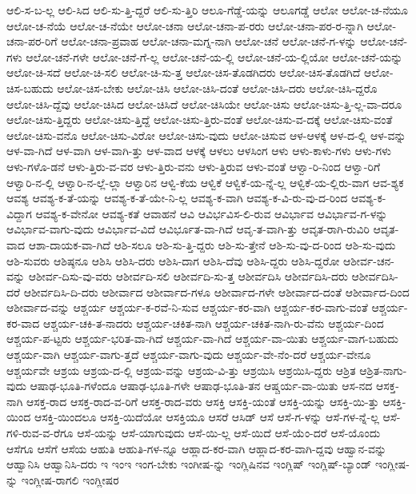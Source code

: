{ಆಲಿ-ಸ-ಬ-ಲ್ಲ
ಆಲಿ-ಸಿದ
ಆಲಿ-ಸು-ತ್ತಿ-ದ್ದರೆ
ಆಲಿ-ಸು-ತ್ತಿರಿ
ಆಲೂ-ಗೆಡ್ಡೆ-ಯನ್ನು
ಆಲೂಗಡ್ಡೆ
ಆಲೋ
ಆಲೋ-ಚ-ನೆಯೂ
ಆಲೋ-ಚ-ನೆಯೆ
ಆಲೋ-ಚ-ನೆಯೇ
ಆಲೋ-ಚನಾ
ಆಲೋ-ಚನಾ-ಪ-ರರು
ಆಲೋ-ಚನಾ-ಪರ-ರ-ನ್ನಾಗಿ
ಆಲೋ-ಚನಾ-ಪರ-ರಿಗೆ
ಆಲೋ-ಚನಾ-ಪ್ರವಾಹ
ಆಲೋ-ಚನಾ-ಮಗ್ನ-ನಾಗಿ
ಆಲೋ-ಚನೆ
ಆಲೋ-ಚನೆ-ಗ-ಳನ್ನು
ಆಲೋ-ಚನೆ-ಗಳು
ಆಲೋ-ಚನೆ-ಗಳೇ
ಆಲೋ-ಚನೆ-ಗೆ-ಲ್ಲ
ಆಲೋ-ಚನೆ-ಯ-ಲ್ಲಿ
ಆಲೋ-ಚನೆ-ಯ-ಲ್ಲಿಯೋ
ಆಲೋ-ಚನೆ-ಯನ್ನು
ಆಲೋ-ಚಿ-ಸದೆ
ಆಲೋ-ಚಿ-ಸಲಿ
ಆಲೋ-ಚಿ-ಸು-ತ್ತ
ಆಲೋ-ಚಿಸ-ತೊಡಗಿದರು
ಆಲೋ-ಚಿಸ-ತೊಡಗಿದೆ
ಆಲೋ-ಚಿಸ-ಬಹುದು
ಆಲೋ-ಚಿಸ-ಬೇಕು
ಆಲೋ-ಚಿಸಿ
ಆಲೋ-ಚಿಸಿ-ದಂತೆ
ಆಲೋ-ಚಿಸಿ-ದರು
ಆಲೋ-ಚಿಸಿ-ದ್ದರೊ
ಆಲೋ-ಚಿಸಿ-ದ್ದೆವು
ಆಲೋ-ಚಿಸಿದ
ಆಲೋ-ಚಿಸಿದೆ
ಆಲೋ-ಚಿಸಿಯೇ
ಆಲೋ-ಚಿಸು
ಆಲೋ-ಚಿಸು-ತ್ತಿ-ಲ್ಲ-ವಾ-ದರೂ
ಆಲೋ-ಚಿಸು-ತ್ತಿದ್ದರು
ಆಲೋ-ಚಿಸು-ತ್ತಿದ್ದೆ
ಆಲೋ-ಚಿಸು-ತ್ತಿರು-ವಂತೆ
ಆಲೋ-ಚಿಸು-ವ-ದಕ್ಕೆ
ಆಲೋ-ಚಿಸು-ವಂತೆ
ಆಲೋ-ಚಿಸು-ವನೊ
ಆಲೋ-ಚಿಸು-ವಿರೋ
ಆಲೋ-ಚಿಸು-ವುದು
ಆಲೋ-ಚಿಸುವ
ಆಳ-ಆಳಕ್ಕೆ
ಆಳ-ದ-ಲ್ಲಿ
ಆಳ-ವನ್ನು
ಆಳ-ವಾ-ಗಿದೆ
ಆಳ-ವಾಗಿ
ಆಳ-ವಾಗಿ-ತ್ತು
ಆಳ-ವಾದ
ಆಳಕ್ಕೆ
ಆಳಲು
ಆಳಸಿಂಗ
ಆಳು
ಆಳು-ಕಾಳು-ಗಳು
ಆಳು-ಗಳು
ಆಳು-ಗಳೊ-ಡನೆ
ಆಳು-ತ್ತಿರು-ವ-ವರ
ಆಳು-ತ್ತಿರು-ವನು
ಆಳು-ತ್ತಿರುವ
ಆಳು-ವಂತೆ
ಆಳ್ವಾ-ರಿ-ನಿಂದ
ಆಳ್ವಾ-ರಿಗೆ
ಆಳ್ವಾರಿ-ನ-ಲ್ಲಿ
ಆಳ್ವಾರಿ-ನ-ಲ್ಲೆ-ಲ್ಲಾ
ಆಳ್ವಾರಿನ
ಆಳ್ವಿ-ಕೆಯ
ಆಳ್ವಿಕೆ
ಆಳ್ವಿಕೆ-ಯ-ನ್ನೆ-ಲ್ಲ
ಆಳ್ವಿಕೆ-ಯ-ಲ್ಲಿರು-ವಾಗ
ಆವ-ಶ್ಯಕ
ಆವಶ್ಯ
ಆವಶ್ಯ-ಕ-ತೆ-ಯನ್ನು
ಆವಶ್ಯ-ಕ-ತೆ-ಯೇ-ನಿ-ಲ್ಲ
ಆವಶ್ಯ-ಕ-ವಾಗಿ
ಆವಶ್ಯ-ಕ-ವಿ-ರು-ವು-ದ-ರಿಂದ
ಆವಶ್ಯ-ಕ-ವಿದ್ದಾಗ
ಆವಶ್ಯ-ಕ-ವೇನೋ
ಆವಶ್ಯ-ಕತೆ
ಆವಾಹನೆ
ಆವಿ
ಆವಿರ್ಭವಿಸ-ಲಿ-ರುವ
ಆವಿರ್ಭಾವ
ಆವಿರ್ಭಾವ-ಗ-ಳನ್ನು
ಆವಿರ್ಭಾವ-ವಾಗು-ವುದು
ಆವಿರ್ಭಾವ-ವಿದೆ
ಆವಿರ್ಭೂತ-ವಾ-ಗಿದೆ
ಆವೃ-ತ-ವಾಗಿ-ತ್ತು
ಆವೃತ-ರಾಗಿ-ರುವಿರಿ
ಆವೃತ-ವಾದ
ಆಶಾ-ದಾಯಕ-ವಾ-ಗಿದೆ
ಆಶಿ-ಸಲೂ
ಆಶಿ-ಸು-ತ್ತಿ-ದ್ದರು
ಆಶಿ-ಸು-ತ್ತೇನೆ
ಆಶಿ-ಸು-ವು-ದ-ರಿಂದ
ಆಶಿ-ಸು-ವುದು
ಆಶಿ-ಸುವರು
ಆಶಿಷ್ಠನೂ
ಆಶಿಸಿ
ಆಶಿಸಿ-ದರು
ಆಶಿಸಿ-ದಾಗ
ಆಶಿಸಿ-ದೆವು
ಆಶಿಸಿ-ದ್ದರು
ಆಶಿಸಿ-ದ್ದರೋ
ಆಶೀರ್ವ-ಚನ-ವನ್ನು
ಆಶೀರ್ವ-ದಿಸು-ವು-ವರು
ಆಶೀರ್ವದಿ-ಸಲಿ
ಆಶೀರ್ವದಿ-ಸು-ತ್ತ
ಆಶೀರ್ವದಿಸಿ
ಆಶೀರ್ವದಿಸಿ-ದರು
ಆಶೀರ್ವದಿಸಿ-ದರೆ
ಆಶೀರ್ವದಿಸಿ-ದಿ-ದರು
ಆಶೀರ್ವಾದ
ಆಶೀರ್ವಾದ-ಗಳೂ
ಆಶೀರ್ವಾದ-ಗಳೇ
ಆಶೀರ್ವಾದ-ದಂತೆ
ಆಶೀರ್ವಾದ-ದಿಂದ
ಆಶೀರ್ವಾದ-ವನ್ನು
ಆಶ್ಚರ್ಯ
ಆಶ್ಚರ್ಯ-ಕ-ರವೆ-ನಿ-ಸುವ
ಆಶ್ಚರ್ಯ-ಕರ-ವಾಗಿ
ಆಶ್ಚರ್ಯ-ಕರ-ವಾಗು-ವಂತೆ
ಆಶ್ಚರ್ಯ-ಕರ-ವಾದ
ಆಶ್ಚರ್ಯ-ಚಕಿ-ತ-ನಾದರು
ಆಶ್ಚರ್ಯ-ಚಕಿತ-ನಾಗಿ
ಆಶ್ಚರ್ಯ-ಚಕಿತ-ನಾಗಿ-ರು-ವೆನು
ಆಶ್ಚರ್ಯ-ದಿಂದ
ಆಶ್ಚರ್ಯ-ಪ-ಟ್ಟರು
ಆಶ್ಚರ್ಯ-ಭರಿತ-ವಾ-ಗಿದೆ
ಆಶ್ಚರ್ಯ-ವಾ-ಗಿದೆ
ಆಶ್ಚರ್ಯ-ವಾ-ಯಿತು
ಆಶ್ಚರ್ಯ-ವಾಗ-ಬಹುದು
ಆಶ್ಚರ್ಯ-ವಾಗಿ
ಆಶ್ಚರ್ಯ-ವಾಗು-ತ್ತದೆ
ಆಶ್ಚರ್ಯ-ವಾಗು-ವುದು
ಆಶ್ಚರ್ಯ-ವೇ-ನೆಂ-ದರೆ
ಆಶ್ಚರ್ಯ-ವೇನೂ
ಆಶ್ಚರ್ಯವೇ
ಆಶ್ರಯ
ಆಶ್ರಯ-ದ-ಲ್ಲಿ
ಆಶ್ರಯ-ವನ್ನು
ಆಶ್ರಯ-ವಿ-ತ್ತು
ಆಶ್ರಯಿಸಿ
ಆಶ್ರಯಿಸಿ-ದ್ದರು
ಆಶ್ರಿತ
ಆಶ್ರಿತ-ನಾಗು-ವುದು
ಆಷಾಢ-ಭೂತಿ-ಗಳೆಂದೂ
ಆಷಾಢ-ಭೂತಿ-ಗಳೇ
ಆಷಾಢ-ಭೂತಿ-ತನ
ಆಷ್ಚರ್ಯ-ವಾ-ಯಿತು
ಆಸ-ನದ
ಆಸಕ್ತ-ನಾಗಿ
ಆಸಕ್ತ-ರಾದ
ಆಸಕ್ತ-ರಾದ-ವ-ರಿಗೆ
ಆಸಕ್ತ-ರಾದ-ವರು
ಆಸಕ್ತಿ
ಆಸಕ್ತಿ-ಯಂತೆ
ಆಸಕ್ತಿ-ಯನ್ನು
ಆಸಕ್ತಿ-ಯಿ-ತ್ತು
ಆಸಕ್ತಿ-ಯಿಂದ
ಆಸಕ್ತಿ-ಯಿಂದಲೂ
ಆಸಕ್ತಿ-ಯಿದೆಯೋ
ಆಸಕ್ತಿಯೂ
ಆಸರೆ
ಆಸಿಡ್
ಆಸೆ
ಆಸೆ-ಗ-ಳನ್ನು
ಆಸೆ-ಗಳ-ನ್ನೆ-ಲ್ಲ
ಆಸೆ-ಗಳಿ-ರುವ-ವ-ರೆಗೂ
ಆಸೆ-ಯನ್ನು
ಆಸೆ-ಯಾಗುವುದು
ಆಸೆ-ಯಿ-ಲ್ಲ
ಆಸೆ-ಯಿದೆ
ಆಸೆ-ಯೆಂ-ದರೆ
ಆಸೆ-ಯೊಂದು
ಆಸೆಗೂ
ಆಸೆಗೆ
ಆಸೆಯ
ಆಹುತಿ
ಆಹುತಿ-ಗಳ-ನ್ನೂ
ಆಹ್ಲಾದ-ಕರ-ವಾಗಿ
ಆಹ್ಲಾದ-ಕರ-ವಾಗಿ-ದ್ದವು
ಆಹ್ವಾನ-ವನ್ನು
ಆಹ್ವಾನಿಸಿ
ಆಹ್ವಾನಿಸಿ-ದರು
ಇ
ಇಂಇ
ಇಂಗ-ಬೇಕು
ಇಂಗೀಷ-ನ್ನು
ಇಂಗ್ಲಿಷಿನವ
ಇಂಗ್ಲಿಷ್
ಇಂಗ್ಲಿಷ್-ಬ್ಯಾಂಡ್
ಇಂಗ್ಲೀಷ-ನ್ನು
ಇಂಗ್ಲೀಷ-ರಾಗಲಿ
ಇಂಗ್ಲೀಷರ
}
